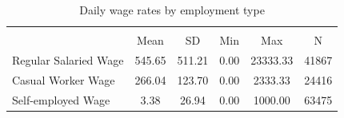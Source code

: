 \begin{table}[htbp]\centering
\def\sym#1{\ifmmode^{#1}\else\(^{#1}\)\fi}
\caption{Daily wage rates by employment type}
\begin{tabular}{l*{1}{ccccc}}
\hline
                    &\multicolumn{5}{c}{}                                            \\
                    &        Mean&          SD&         Min&         Max&           N\\
\hline
Regular Salaried Wage&      545.65&      511.21&        0.00&    23333.33&       41867\\
Casual Worker Wage  &      266.04&      123.70&        0.00&     2333.33&       24416\\
Self-employed Wage  &        3.38&       26.94&        0.00&     1000.00&       63475\\
\hline
\end{tabular}
\end{table}
